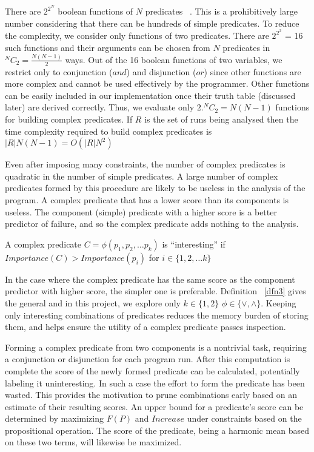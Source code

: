 There are $2^{2^N}$ boolean functions of $N$ predicates ~\cite{MathWorld:BoolFuncs}.  This is a prohibitively large number considering that there can be hundreds of simple predicates.  To reduce the complexity, we consider only functions of two predicates.  There are $2^{2^2}$ = 16 such functions and their arguments can be chosen from $N$ predicates in $^NC_2 = \frac{N(N-1)}{2}$ ways.  Out of the 16 boolean functions of two variables, we restrict only to conjunction ($and$) and disjunction ($or$) since other functions are more complex and cannot be used effectively by the programmer.  Other functions can be easily included in our implementation once their truth table (discussed later) are derived correctly.  Thus, we evaluate only $2. ^NC_2 = N(N-1)$ functions for building complex predicates.  If $R$ is the set of runs being analysed then the time complexity required to build complex predicates is $|R|N(N-1) = O(|R|N^2)$

Even after imposing many constraints, the number of complex predicates is quadratic in the number of simple predicates.  A large number of complex predicates formed by this procedure are likely to be useless in the analysis of the program.  A complex predicate that has a lower score than its components is useless.  The component (simple) predicate with a higher score is a better predictor of failure, and so the complex predicate adds nothing to the analysis.

\begin{defn}
\label{dfn3}
A complex predicate $C = \phi(p_1, p_2, \ldots p_k)$ is ``interesting'' if $Importance(C) > Importance(p_i)$ for $i \in \{1, 2, \ldots k\}$
\end{defn}

In the case where the complex predicate has the same score as the component predictor with higher score, the simpler one is preferable.  Definition ~\ref{dfn3} gives the general and in this project, we explore only $k \in \{1,2\}$ $\phi \in \{\vee, \wedge\}$.  Keeping only interesting combinations of predicates reduces the memory burden of storing them, and helps ensure the utility of a complex predicate passes inspection.

Forming a complex predicate from two components is a nontrivial task, requiring a conjunction or disjunction for each program run.  After this computation is complete the score of the newly formed predicate can be calculated, potentially labeling it uninteresting.  In such a case the effort to form the predicate has been wasted.  This provides the motivation to prune combinations early based on an estimate of their resulting scores.  An upper bound for a predicate's score can be determined by maximizing $F(P)$ and $Increase$ under constraints based on the propositional operation.  The score of the predicate, being a harmonic mean based on these two terms, will likewise be maximized.


